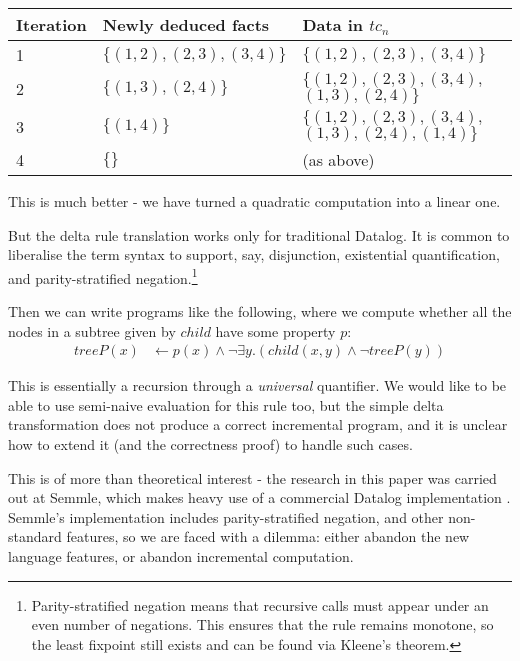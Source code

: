 \begin{center}
  \begin{tabular} {|p{3.5em}|p{10em}|p{10em}|}
    \hline
    Iteration & Newly deduced facts & Data in $tc_n$ \\
    \hline
    1 & $\{ (1, 2), (2, 3), (3, 4) \}$ & $\{ (1, 2), (2, 3), (3, 4) \}$\\
    2 & $\{ (1, 3), (2, 4) \}$ & $\{ (1, 2), (2, 3), (3, 4),$ $(1, 3), (2, 4) \}$\\
    3 & $\{ (1, 4) \}$ & $\{ (1, 2), (2, 3), (3, 4),$ $(1, 3), (2, 4), (1, 4) \}$\\
    4 & $\{ \}$ & (as above) \\
    \hline
  \end{tabular}
\end{center}

This is much better - we have turned a quadratic computation into a linear one.

But the delta rule translation works only for traditional Datalog. It is common to
liberalise the term syntax to support, say, disjunction, existential quantification, and parity-stratified
negation.\footnote{Parity-stratified negation means that recursive calls must
  appear under an even number of negations. This ensures that the rule remains
  monotone, so the least fixpoint still exists and can be found via Kleene's theorem.}

Then we can write programs like the following, where we compute whether all the
nodes in a subtree given by $child$ have some property $p$:
\begin{align*}
  treeP(x) &\leftarrow p(x) \wedge \neg \exists y . (child(x,y) \wedge \neg treeP(y))
\end{align*}

This is essentially a recursion through a \emph{universal} quantifier. We would
like to be able to use semi-naive evaluation for this rule too, but the simple delta
transformation does not produce a correct incremental program, and it is unclear how to extend it (and the
correctness proof) to handle such cases.

This is of more than theoretical interest - the research
in this paper was carried out at Semmle, which
makes heavy use of a commercial Datalog implementation
\autocites{semmleWebsite}{avgustinov2016ql}{sereni2008adding}{schafer2010type}.
Semmle's implementation includes parity-stratified negation, and other non-standard
features, so we are faced with a dilemma: either abandon the new language
features, or abandon incremental computation.

